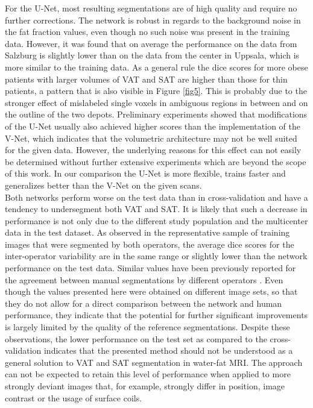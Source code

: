\documentclass[10pt,letterpaper]{article}
\begin{document}
	For the U-Net, most resulting segmentations are of high quality and require no further corrections. The network is robust in regards to the background noise in the fat fraction values, even though no such noise was present in the training data. However, it was found that on average the performance on the data from Salzburg is slightly lower than on the data from the center in Uppsala, which is more similar to the training data. As a general rule the dice scores for more obese patients with larger volumes of VAT and SAT are higher than those for thin patients, a pattern that is also visible in Figure \ref{fig5}. This is probably due to the stronger effect of mislabeled single voxels in ambiguous regions in between and on the outline of the two depots. Preliminary experiments showed that modifications of the U-Net usually also achieved higher scores than the implementation of the V-Net, which indicates that the volumetric architecture may not be well suited for the given data. However, the underlying reasons for this effect can not easily be determined without further extensive experiments which are beyond the scope of this work. In our comparison the U-Net is more flexible, trains faster and generalizes better than the V-Net on the given scans. \\
	
	Both networks perform worse on the test data than in cross-validation and have a tendency to undersegment both VAT and SAT. It is likely that such a decrease in performance is not only due to the different study population and the multicenter data in the test dataset. As observed in the representative sample of training images that were segmented by both operators, the average dice scores for the inter-operator variability are in the same range or slightly lower than the network performance on the test data. Similar values have been previously reported for the agreement between manual segmentations by different operators \cite{joshi2013automatic}. Even though the values presented here were obtained on different image sets, so that they do not allow for a direct comparison between the network and human performance, they indicate that the potential for further significant improvements is largely limited by the quality of the reference segmentations. 
	Despite these observations, the lower performance on the test set as compared to the cross-validation indicates that the presented method should not be understood as a general solution to VAT and SAT segmentation in water-fat MRI. The approach can not be expected to retain this level of performance when applied to more strongly deviant images that, for example, strongly differ in position, image contrast or the usage of surface coils. 
	
\end{document}
